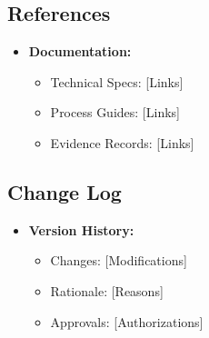 \documentclass{article}
\begin{document}
\subsection{References}
\begin{itemize}
    \item \textbf{Documentation:}
    \begin{itemize}
        \item Technical Specs: [Links]
        \item Process Guides: [Links]
        \item Evidence Records: [Links]
    \end{itemize}
\end{itemize}
\subsection{Change Log}
\begin{itemize}
    \item \textbf{Version History:}
    \begin{itemize}
        \item Changes: [Modifications]
        \item Rationale: [Reasons]
        \item Approvals: [Authorizations]
    \end{itemize}
\end{itemize}
\end{document}
